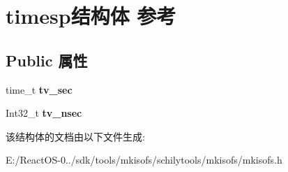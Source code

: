 \hypertarget{structtimesp}{}\section{timesp结构体 参考}
\label{structtimesp}
\subsection*{Public 属性}
\begin{DoxyCompactItemize}
\item 
\mbox{\label{structtimesp_aed314736a4d7c110f6311346f03b0da5}} 
time\+\_\+t {\bfseries tv\+\_\+sec}
\item 
\mbox{\label{structtimesp_a22659d082943e9812e185d1c6c65eb78}} 
Int32\+\_\+t {\bfseries tv\+\_\+nsec}
\end{DoxyCompactItemize}


该结构体的文档由以下文件生成\+:\begin{DoxyCompactItemize}
\item 
E\+:/\+React\+O\+S-\/0../sdk/tools/mkisofs/schilytools/mkisofs/mkisofs.\+h\end{DoxyCompactItemize}
